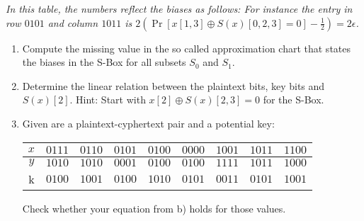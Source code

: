 \documentclass[USenglish,a4paper,12pt]{scrartcl}
\theoremstyle{break}
\theoremstyle{break}
\begin{document}
\vspace{0.5cm}
\emph{In this table, the numbers reflect the biases as follows: For instance the entry in row $0101$ and column $1011$ is $2 (\Pr [x[1,3] \oplus S(x)[0,2,3] = 0]-\frac12) = 2 \epsilon$.}

\begin{enumerate}[label=\alph*)]
\item Compute the missing value in the so called approximation chart that states the biases in the S-Box for all subsets $S_0$ and $S_1$.

\item Determine the linear relation between the plaintext bits, key bits and $S(x)[2]$. Hint: Start with $x[2] \oplus S(x)[2,3] =0$ for the S-Box.

\item Given are a plaintext-cyphertext pair and a potential key: \\
\begin{tabular}{|c|c|c|c|c|c|c|c|c|}
\hline
$x$ & $0111$ & $0110$ & $0101$ & $0100$ & $0000$ & $1001$ & $1011$ & $1100$ \\ \hline
$y$ & $1010$ & $1010$ & $0001$ & $0100$ & $0100$ & $1111$ & $1011$ & $1000$\\
\hline
k & $0100$ & $1001$ & $0100$ & $1010$ & $0101$ & $0011$ & $0101$ & $1001$ \\
\hline
\end{tabular}

Check whether your equation from b) holds for those values.


\end{enumerate}
\end{document}
